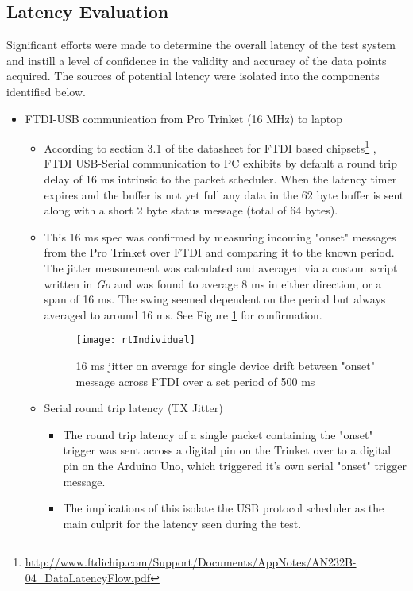 \subsection{Latency Evaluation} \label{latencyCalc}
Significant efforts were made to determine the overall latency of the test system and instill a level of confidence in the validity and accuracy of the data points acquired. The sources of potential latency were isolated into the components identified below.
\begin{itemize}
    \item FTDI-USB communication from Pro Trinket (16 MHz) to laptop
    \begin{itemize}
        \item According to section 3.1 of the datasheet for FTDI based chipsets\footnote{\url{http://www.ftdichip.com/Support/Documents/AppNotes/AN232B-04_DataLatencyFlow.pdf}} , FTDI USB-Serial communication to PC exhibits by default a round trip delay of 16 ms intrinsic to the packet scheduler. When the latency timer expires and the buffer is not yet full any data in the 62 byte buffer is sent along with a short 2 byte status message (total of 64 bytes).
        \item This 16 ms spec was confirmed by measuring incoming "onset" messages from the Pro Trinket over FTDI and comparing it to the known period. The jitter measurement was calculated and averaged via a custom script written in \textit{Go} and was found to average 8 ms in either direction, or a span of 16 ms. The swing seemed dependent on the period but always averaged to around 16 ms. See Figure \ref{fig:rtIndividual} for confirmation.
        \begin{figure}[H] \label{fig:rtIndividual}
            \centering  
            \texttt{[image: rtIndividual]}
            \caption{16 ms jitter on average for single device drift between "onset" message across FTDI over a set period of 500 ms}
        \end{figure}
    \item Serial round trip latency (TX Jitter)
        \begin{itemize}
            \item The round trip latency of a single packet containing the "onset" trigger was sent across a digital pin on the Trinket over to a digital pin on the Arduino Uno, which triggered it's own serial "onset" trigger message.
            \item The implications of this isolate the USB protocol scheduler as the main culprit for the latency seen during the test.

\end{itemize}
\end{itemize}
\end{itemize}
